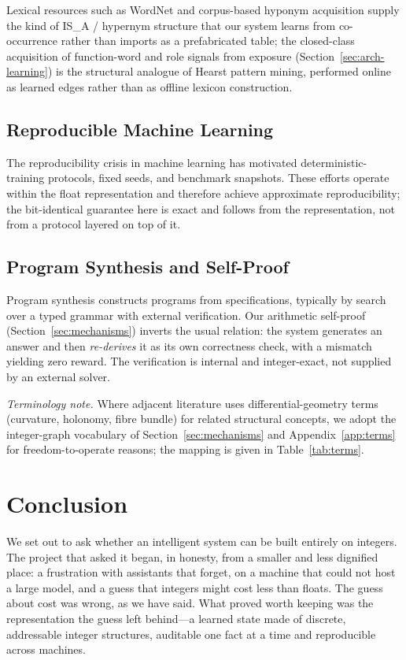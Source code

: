 \documentclass[11pt,a4paper]{article}
\begin{document}
Lexical resources such as WordNet \citep{miller1995wordnet} and
corpus-based hyponym acquisition \citep{hearst1992hyponyms} supply the
kind of IS\_A / hypernym structure that our system learns from
co-occurrence rather than imports as a prefabricated table; the
closed-class acquisition of function-word and role signals from exposure
(Section~\ref{sec:arch-learning}) is the structural analogue of Hearst
pattern mining, performed online as learned edges rather than as offline
lexicon construction.

\subsection{Reproducible Machine Learning}
The reproducibility crisis in machine learning
\citep{pineau2021improving} has motivated deterministic-training
protocols, fixed seeds, and benchmark snapshots.
These efforts operate within the float representation and therefore
achieve approximate reproducibility; the bit-identical guarantee here is
exact and follows from the representation, not from a protocol layered on
top of it.

\subsection{Program Synthesis and Self-Proof}
Program synthesis \citep{gulwani2017synthesis} constructs programs from
specifications, typically by search over a typed grammar with external
verification. Our arithmetic self-proof (Section~\ref{sec:mechanisms})
inverts the usual relation: the system generates an answer and then
\emph{re-derives} it as its own correctness check, with a mismatch
yielding zero reward. The verification is internal and integer-exact,
not supplied by an external solver.

\smallskip\noindent\textit{Terminology note.} Where adjacent literature
uses differential-geometry terms (curvature, holonomy, fibre bundle) for
related structural concepts, we adopt the integer-graph vocabulary of
Section~\ref{sec:mechanisms} and Appendix~\ref{app:terms} for
freedom-to-operate reasons; the mapping is given in
Table~\ref{tab:terms}.

\section{Conclusion}
\label{sec:conclusion}

We set out to ask whether an intelligent system can be built entirely
on integers. The project that asked it began, in honesty, from a smaller
and less dignified place: a frustration with assistants that forget, on
a machine that could not host a large model, and a guess that integers
might cost less than floats. The guess about cost was wrong, as we have
said. What proved worth keeping was the representation the guess left
behind---a learned state made of discrete, addressable integer
structures, auditable one fact at a time and reproducible across
machines.
\end{document}
